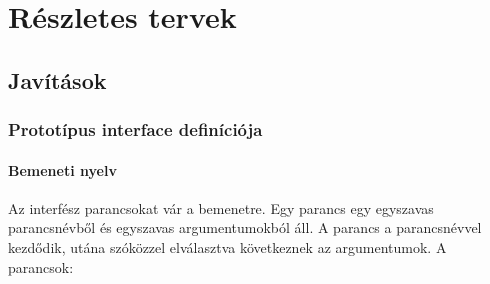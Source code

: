 
\chapter{Részletes tervek}
\setcounter{section}{-1}
\section{Javítások}

\subsection{Prototípus interface definíciója}

\subsubsection{Bemeneti nyelv}

Az interfész parancsokat vár a bemenetre. Egy parancs egy egyszavas parancsnévből és egyszavas argumentumokból áll. A parancs a parancsnévvel kezdődik, utána szóközzel elválasztva következnek az argumentumok. A parancsok:

